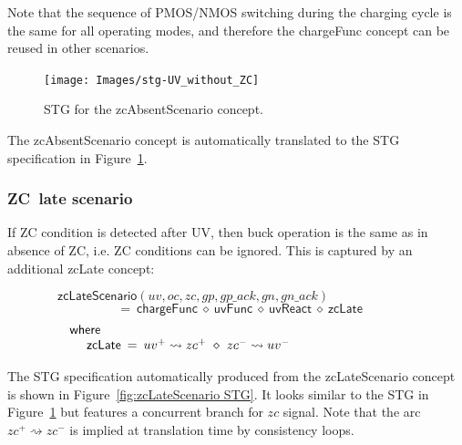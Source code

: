 \documentclass[british, journal]{IEEEtran}
\begin{document}
Note that the sequence of PMOS/NMOS switching during the charging cycle is the same
for all operating modes, and therefore the \textsf{chargeFunc} concept can be reused
in other scenarios.

\begin{figure}[H]
\vspace{-3mm}
\begin{centering}
\texttt{[image: Images/stg-UV\_without\_ZC]}
\par\end{centering}
\protect\caption{\label{fig:zcAbsentScenario STG} STG for the \textsf{zcAbsentScenario} concept.}
\end{figure}

The \textsf{zcAbsentScenario} concept is automatically translated to the STG specification
in Figure~\ref{fig:zcAbsentScenario STG}.

\subsubsection{ZC~late scenario}


If ZC condition is detected after UV, then buck operation is the same as in
absence of ZC, i.e. ZC conditions can be ignored. This is captured by an additional
\textsf{zcLate} concept:

\vspace{-4mm}
\[
\mathsf{zcLateScenario}(uv,oc,zc,gp,gp\_ack,gn,gn\_ack)~~~~~~~~~~~~~~~~~~~~~~~~~~~~~~~
\]
\vspace{-6mm}
\[
~~=~\mathsf{chargeFunc}~\diamond~\mathsf{uvFunc}~\diamond~\mathsf{uvReact}~\diamond~\mathsf{zcLate}
\]
\vspace{-5mm}
\[
\begin{array}{lcl}
\mathsf{where}&~&\\

~~~~\mathsf{zcLate}&\hspace{-2mm}=&\hspace{-2mm}uv^{+}\rightsquigarrow zc^{+}~\diamond~ zc^{-}\rightsquigarrow uv^{-}~~~~~~~~~~~~~~~~~~~~~~~~~~~

\end{array}
\]

The STG specification automatically produced from the \textsf{zcLateScenario} concept
is shown in Figure~\ref{fig:zcLateScenario STG}. It looks similar to the STG in
Figure~\ref{fig:zcAbsentScenario STG} but features a concurrent branch for $zc$ signal.
Note that the arc $zc^{+}\rightsquigarrow zc^{-}$ is implied at translation
time by consistency loops.
\end{document}
